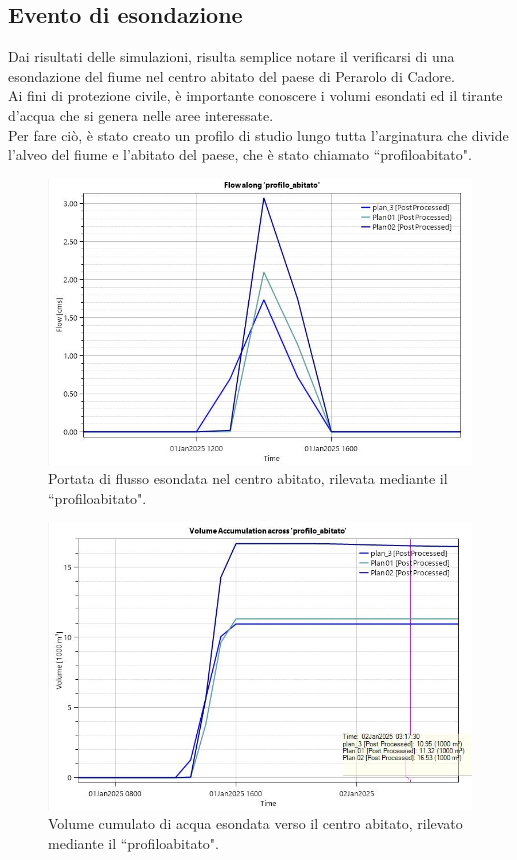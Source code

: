 \subsection{Evento di esondazione}
Dai risultati delle simulazioni, risulta semplice notare il verificarsi di una esondazione del fiume nel centro abitato del paese di Perarolo di Cadore.\\
Ai fini di protezione civile, è importante conoscere i volumi esondati ed il tirante d'acqua che si genera nelle aree interessate.\\
Per fare ciò, è stato creato un profilo di studio lungo tutta l'arginatura che divide l'alveo del fiume e l'abitato del paese, che è stato chiamato ``profilo\textunderscore abitato".

\begin{figure}[htb] \centering
    \includegraphics[scale=0.5]{immagini/flow_centro_abitato.JPG}
    \caption{Portata di flusso esondata nel centro abitato, rilevata mediante il ``profilo\textunderscore abitato".}
    \label{figure:flow_centro_abitato}
\end{figure}

\begin{figure}[htb] \centering
    \includegraphics[scale=0.5]{immagini/volume_accumulation_centro_abitato.JPG}
    \caption{Volume cumulato di acqua esondata verso il centro abitato, rilevato mediante il ``profilo\textunderscore abitato".}
    \label{figure:volume_accumulation_centro_abitato}
\end{figure}

